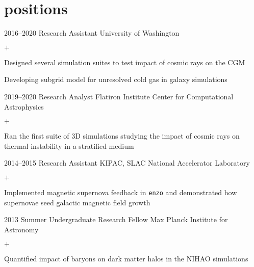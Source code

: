 \documentclass[]{luger-cv} %
\begin{document}
\section{positions}
\begin{entrylist}


\entry
{2016--2020}
{Research Assistant}
{University of Washington}
{%
\vspace{-1em}
\begin{list}{$+$}{\cvlist}
\item Designed several simulation suites to test impact of cosmic rays on the CGM
\item Developing subgrid model for unresolved cold gas in galaxy simulations
\end{list}
}


\entry
{2019--2020}
{Research Analyst}
{Flatiron Institute Center for Computational Astrophysics}
{%
\vspace{-1em}
\begin{list}{$+$}{\cvlist}
\item Ran the first suite of 3D simulations studying the impact of cosmic rays on thermal instability in a stratified medium
\end{list}
}


\entry
{2014--2015}
{Research Assistant}
{KIPAC, SLAC National Accelerator Laboratory}
{%
\vspace{-1em}
\begin{list}{$+$}{\cvlist}
\item Implemented magnetic supernova feedback in \texttt{enzo} and demonstrated how supernovae seed galactic magnetic field growth
\end{list}
}


\ifdefined \onepage \else
\entry
{2013}
{Summer Undergraduate Research Fellow}
{Max Planck Institute for Astronomy}
{%
\vspace{-1em}
\begin{list}{$+$}{\cvlist}
\item Quantified impact of baryons on dark matter halos in the NIHAO simulations
\end{list}
}


\end{entrylist}
\end{document}
